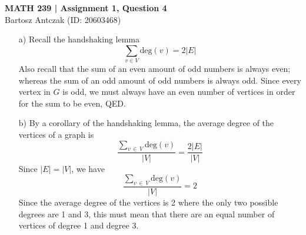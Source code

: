 \documentclass{report}
\begin{document}
\noindent \textbf{MATH 239 | Assignment 1, Question 4}\\
Bartosz Antczak (ID: 20603468)
\onehalfspacing
\begin{enumerate}
\item[a)] Recall the handshaking lemma
$$\sum_{v\in V} \mathrm{deg}(v) = 2\vert E \vert$$
Also recall that the sum of an even amount of odd numbers is always even; whereas the sum of an odd amount of odd numbers is always odd.
Since every vertex in $G$ is odd, we must always have an even number of vertices in order for the sum to be even, QED.
\item[b)] By a corollary of the handshaking lemma, the average degree of the vertices of a graph is
$$\frac{\displaystyle\sum_{v \,\in\, V} \mathrm{deg}(v)}{\vert V \vert} = \frac{2 \vert E \vert}{\vert V \vert}$$
Since $\vert E \vert = \vert V \vert$, we have
$$\frac{\displaystyle\sum_{v \,\in\, V} \mathrm{deg}(v)}{\vert V \vert} = 2$$
Since the average degree of the vertices is 2 where the only two possible degrees are 1 and 3, this must mean that there are an equal number of vertices of degree 1 and degree 3.
\end{enumerate}
\end{document}
